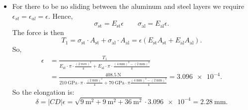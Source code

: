 \begin{derivation}
\begin{itemize}
\begin{align*}
        A_y &= \qty{333,33}{\N}  \\
        A_z &= \qty{-333,33}{\N}  \\
        T_2 &= \qty{250}{\N}
      .\end{align*}
    \item[Q1.5] For there to be no sliding between the aluminum and steel layers we require $\epsilon_{st} = \epsilon_{al} = \epsilon$.
      Hence,
      \begin{equation*}
        \sigma_{\mathrm{st}} = E_{\mathrm{st}} \epsilon \qquad \sigma_{\mathrm{al}} = E_{\mathrm{al}} \epsilon
      .\end{equation*}
      The force is then
      \begin{equation*}
        T_1 = \sigma_{\mathrm{st}} \cdot A_{\mathrm{st}} + \sigma_{\mathrm{al}} \cdot A_{\mathrm{al}} = \epsilon \left( E_{\mathrm{st}} A_{\mathrm{st}} + E_{\mathrm{al}} A_{\mathrm{al}} \right)
      .\end{equation*}
      So,
      \begin{align*}
        \epsilon &= \frac{T_1}{E_{\mathrm{st}} \cdot \pi \cdot \frac{\left( \qty{2}{mm}  \right)^2}{4} + E_{\mathrm{al}} \cdot \pi \cdot \frac{\left( \qty{4}{\mm}  \right)^2 - \left( \qty{2}{\mm}  \right)^2}{4}} \\
                 &= \frac{\qty{408.5}{\N} }{\qty{210}{\GPa} \cdot \pi \cdot \frac{\left( \qty{2}{\mm}  \right)^2}{4} + \qty{70}{\GPa} \cdot \pi \frac{\left( \qty{4}{\mm}  \right)^2 - \left( \qty{2}{\mm}  \right)^2}{4}} = \num{3,096e-4}
      .\end{align*}
      So the elongation is:
      \begin{equation*}
        \delta = \left| CD  \right| \epsilon = \sqrt{\qty{9}{\m^2} + \qty{9}{\m^2} + \qty{36}{\m^2}} \cdot \num{3,096e-4} = \qty{2,28}{\mm}  
      .\end{equation*}
  \end{itemize}
\end{derivation}


